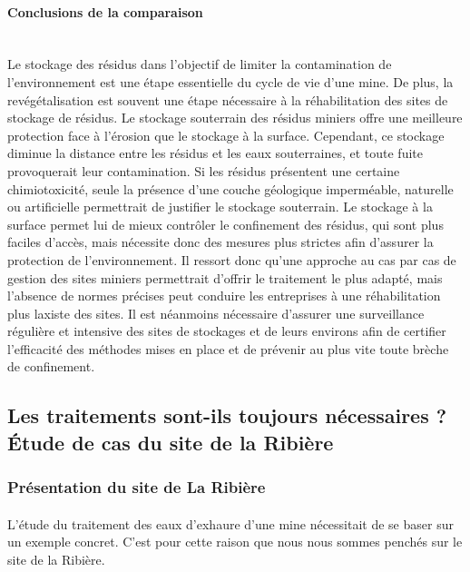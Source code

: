 \documentclass{article}
\begin{document}
\paragraph{Conclusions de la comparaison \\ \\}
Le stockage des résidus dans l’objectif de limiter la contamination de l’environnement est une étape essentielle du cycle de vie d’une mine.
De plus, la revégétalisation est souvent une étape nécessaire à la réhabilitation des sites de stockage de résidus.
Le stockage souterrain des résidus miniers offre une meilleure protection face à l’érosion que le stockage à la surface. Cependant, ce stockage diminue la distance entre les résidus et les eaux souterraines, et toute fuite provoquerait leur contamination. Si les résidus présentent une certaine chimiotoxicité, seule la présence d’une couche géologique imperméable, naturelle ou artificielle permettrait de justifier le stockage souterrain. Le stockage à la surface permet lui de mieux contrôler le confinement des résidus, qui sont plus faciles d’accès, mais nécessite donc des mesures plus strictes afin d’assurer la protection de l’environnement.
Il ressort donc qu’une approche au cas par cas de gestion des sites miniers permettrait d’offrir le traitement le plus adapté, mais l’absence de normes précises peut conduire les entreprises à une réhabilitation plus laxiste des sites.
Il est néanmoins nécessaire d’assurer une surveillance régulière et intensive des sites de stockages et de leurs environs afin de certifier l’efficacité des méthodes mises en place et de prévenir au plus vite toute brèche de confinement.


\subsection{Les traitements sont-ils toujours nécessaires ? \\ Étude de cas du site de la Ribière}%
\subsubsection{Présentation du site de La Ribière}
\paragraph{} L’étude du traitement des eaux d’exhaure d’une mine nécessitait de se baser sur un exemple concret. C’est pour cette raison que nous nous sommes penchés sur le site de la Ribière. 
\end{document}
